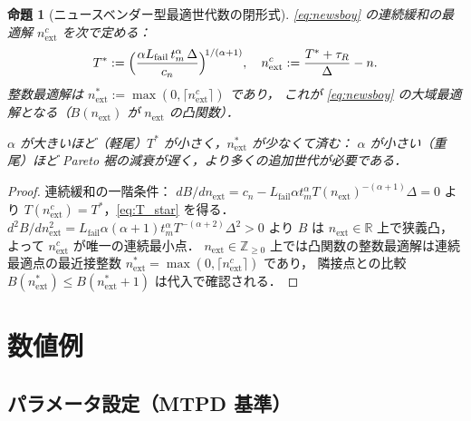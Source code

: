 \documentclass[12pt,a4paper]{article}
\theoremstyle{plain}
\newtheorem{proposition}[theorem]{命題}
\theoremstyle{definition}
\theoremstyle{remark}
\newcommand{\Z}{\mathbb{Z}}
\begin{document}
\begin{proposition}[ニュースベンダー型最適世代数の閉形式]\label{prop:newsboy}
\eqref{eq:newsboy} の連続緩和の最適解 $n_{\mathrm{ext}}^c$ を次で定める：
\begin{equation}\label{eq:T_star}
T^*:=\Bigl(\frac{\alpha L_{\mathrm{fail}}\,t_m^\alpha\,\Delta}{c_n}\Bigr)^{\!1/(\alpha+1)},
\quad
n_{\mathrm{ext}}^c:=\frac{T^*+\tau_R}{\Delta}-n.
\end{equation}
整数最適解は $n_{\mathrm{ext}}^*:=\max(0,\lceil n_{\mathrm{ext}}^c\rceil)$ であり，
これが \eqref{eq:newsboy} の大域最適解となる（$B(n_{\mathrm{ext}})$ が $n_{\mathrm{ext}}$ の凸関数）．

$\alpha$ が大きいほど（軽尾）$T^*$ が小さく，$n_{\mathrm{ext}}^*$ が少なくて済む：
$\alpha$ が小さい（重尾）ほど Pareto 裾の減衰が遅く，より多くの追加世代が必要である．
\end{proposition}

\begin{proof}
連続緩和の一階条件：
$dB/dn_{\mathrm{ext}}=c_n-L_{\mathrm{fail}}\alpha t_m^\alpha T(n_{\mathrm{ext}})^{-(\alpha+1)}\Delta=0$
より $T(n_{\mathrm{ext}}^c)=T^*$，\eqref{eq:T_star} を得る．
$d^2B/dn_{\mathrm{ext}}^2=L_{\mathrm{fail}}\alpha(\alpha+1)t_m^\alpha T^{-(\alpha+2)}\Delta^2>0$ より
$B$ は $n_{\mathrm{ext}}\in\mathbb{R}$ 上で狭義凸，よって $n_{\mathrm{ext}}^c$ が唯一の連続最小点．
$n_{\mathrm{ext}}\in\Z_{\ge0}$ 上では凸関数の整数最適解は連続最適点の最近接整数
$n_{\mathrm{ext}}^*=\max(0,\lceil n_{\mathrm{ext}}^c\rceil)$ であり，
隣接点との比較 $B(n_{\mathrm{ext}}^*)\le B(n_{\mathrm{ext}}^*+1)$ は代入で確認される．
\end{proof}

\section{数値例}
\label{sec:numerical}

\subsection{パラメータ設定（MTPD 基準）}
\end{document}
